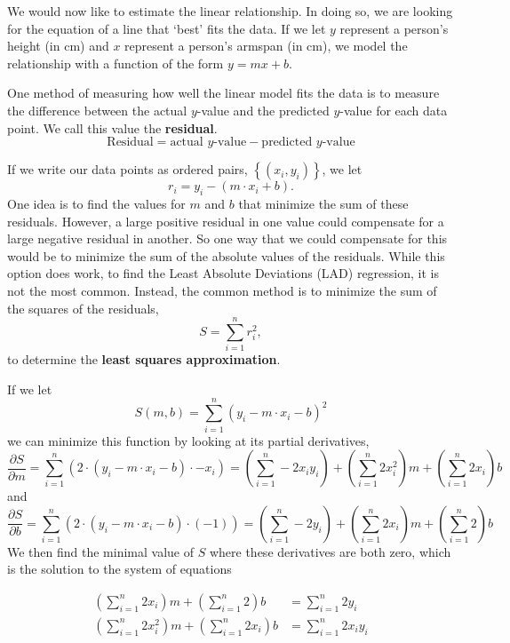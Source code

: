 \documentclass[
]{book}
\theoremstyle{definition}
\theoremstyle{definition}
\theoremstyle{definition}
\theoremstyle{definition}
\theoremstyle{remark}
\begin{document}
We would now like to estimate the linear relationship. In doing so, we are looking for the equation of a line that `best' fits the data. If we let \(y\) represent a person's height (in cm) and \(x\) represent a person's armspan (in cm), we model the relationship with a function of the form \(y=mx+b\).

One method of measuring how well the linear model fits the data is to measure the difference between the actual \(y\)-value and the predicted \(y\)-value for each data point. We call this value the \textbf{residual}.
\[\mbox{Residual} = \mbox{actual }y\mbox{-value} - \mbox{predicted }y\mbox{-value}\]

If we write our data points as ordered pairs, \(\left\{ (x_i,y_i)\right\}\), we let
\[r_i = y_i - \left( m\cdot x_i + b\right).\]
One idea is to find the values for \(m\) and \(b\) that minimize the sum of these residuals. However, a large positive residual in one value could compensate for a large negative residual in another. So one way that we could compensate for this would be to minimize the sum of the absolute values of the residuals. While this option does work, to find the Least Absolute Deviations (LAD) regression, it is not the most common. Instead, the common method is to minimize the sum of the squares of the residuals,
\[S = \sum_{i=1}^n r_i^2,\] to determine the \textbf{least squares approximation}.

If we let
\[S(m,b) = \sum_{i=1}^n (y_i - m\cdot x_i -b)^2\] we can minimize this function by looking at its partial derivatives,
\[\frac{\partial S}{\partial m} = \sum_{i=1}^n \left( 2 \cdot (y_i - m \cdot x_i - b ) \cdot -x_i \right) = \left( \sum_{i=1}^n -2 x_i y_i \right) + \left(\sum_{i=1}^n 2x_i^2 \right) m + \left(\sum_{i=1}^n 2 x_i \right) b\] and \[\frac{\partial S}{\partial b} = \sum_{i=1}^n \left( 2 \cdot (y_i-m\cdot x_i - b) \cdot (-1) \right)  = \left(\sum_{i=1}^n -2y_i \right) +  \left( \sum_{i=1}^n 2 x_i \right) m + \left( \sum_{i=1}^n 2 \right) b\]
We then find the minimal value of \(S\) where these derivatives are both zero, which is the solution to the system of equations

\begin{align}
  \left( \sum_{i=1}^n 2 x_i \right) m + \left( \sum_{i=1}^n 2 \right) b    & = \sum_{i=1}^n 2y_i   \\
  \left(\sum_{i=1}^n 2x_i^2 \right) m + \left(\sum_{i=1}^n 2 x_i \right) b   & =  \sum_{i=1}^n 2 x_i y_i 
\end{align}
\end{document}
